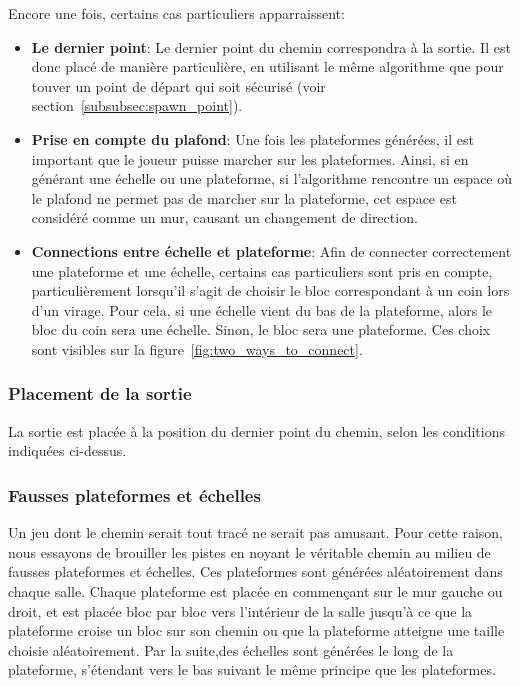 \documentclass[10pt]{report}
\begin{document}
Encore une fois, certains cas particuliers apparraissent:
\begin{itemize}
  \item \textbf{Le dernier point}: Le dernier point du chemin correspondra à la sortie.
  Il est donc placé de manière particulière, en utilisant le
  même algorithme que pour touver un point de départ qui soit sécurisé (voir section~\ref{subsubsec:spawn_point}).
  \item \textbf{Prise en compte du plafond}: Une fois les plateformes
  générées, il est important que le joueur puisse marcher sur les plateformes.
  Ainsi, si en générant une échelle ou une plateforme, si
  l'algorithme rencontre un espace où le plafond ne permet pas de marcher
  sur la plateforme, cet espace est considéré comme un mur, causant un
  changement de direction.
  \item \textbf{Connections entre échelle et plateforme}: Afin de connecter
  correctement une plateforme et une échelle, certains cas particuliers
  sont pris en compte, particulièrement lorsqu'il s'agit de choisir le bloc
  correspondant à un coin lors d'un virage.
  Pour cela, si une échelle vient du bas de la plateforme, alors le bloc du coin sera une échelle.
  Sinon, le bloc sera une plateforme.
  Ces choix sont visibles sur la figure~\ref{fig:two_ways_to_connect}.
\end{itemize}

\subsubsection{Placement de la sortie}

La sortie est placée à la position du dernier point du chemin, selon
les conditions indiquées ci-dessus.

\subsubsection{Fausses plateformes et échelles}

Un jeu dont le chemin serait tout tracé ne serait pas amusant.
Pour cette raison, nous essayons de brouiller les pistes en noyant le
véritable chemin au milieu de fausses plateformes et échelles.
Ces plateformes sont générées aléatoirement dans chaque salle.
Chaque plateforme est placée en commençant sur le mur gauche ou droit,
et est placée bloc par bloc vers l'intérieur de la salle jusqu'à ce
que la plateforme croise un bloc sur son chemin ou
que la plateforme atteigne une taille choisie aléatoirement.
Par la suite,des échelles sont générées le long de la plateforme,
s'étendant vers le bas suivant le même principe que les plateformes.
\end{document}
